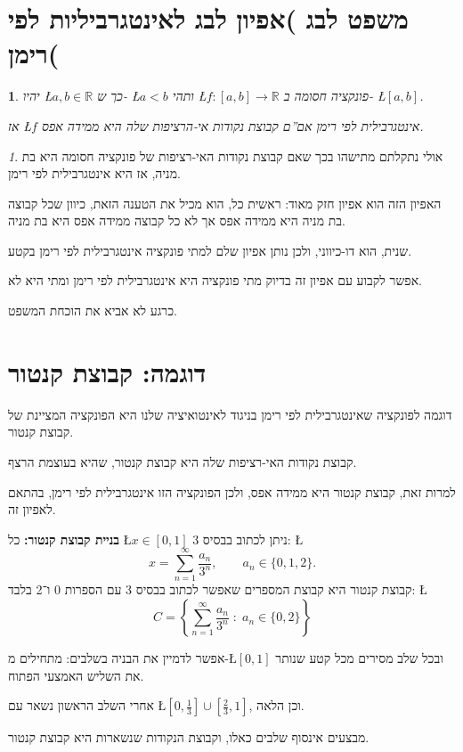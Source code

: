 \documentclass[english,hebrew]{article}
\theoremstyle{remark}
\newtheorem*{rem*}{\protect\remarkname}
\theoremstyle{definition}
\theoremstyle{plain}
\theoremstyle{remark}
\theoremstyle{plain}
\theoremstyle{plain}
\theoremstyle{definition}
\theoremstyle{plain}
\newtheorem*{thm*}{\protect\theoremname}
\providecommand{\remarkname}{הערה}
\providecommand{\theoremname}{משפט}
\begin{document}
\section{משפט לבג )אפיון לבג לאינטגרביליות לפי רימן(}
\begin{thm*}
יהיו \L{$a,b\in\mathbb{R}$} כך ש- \L{$a<b$} ותהי \L{$f:[a,b]\rightarrow\mathbb{R}$}
פונקציה חסומה ב- \L{$[a,b]$}.

אז \L{$f$} אינטגרבילית לפי רימן אם\textquotedblright ם קבוצת נקודות
אי-הרציפות שלה היא ממידה אפס.
\end{thm*}
\begin{rem*}
אולי נתקלתם מתישהו בכך שאם קבוצת נקודות האי-רציפות של פונקציה חסומה
היא בת מניה, אז היא אינטגרבילית לפי רימן.

האפיון הזה הוא אפיון חזק מאוד: ראשית כל, הוא מכיל את הטענה הזאת, כיוון
שכל קבוצה בת מניה היא ממידה אפס אך לא כל קבוצה ממידה אפס היא בת מניה.

שנית, הוא דו-כיווני, ולכן נותן אפיון שלם למתי פונקציה אינטגרבילית
לפי רימן בקטע.

אפשר לקבוע עם אפיון זה בדיוק מתי פונקציה היא אינטגרבילית לפי רימן
ומתי היא לא.

כרגע לא אביא את הוכחת המשפט.
\end{rem*}

\section{דוגמה: קבוצת קנטור}

דוגמה לפונקציה שאינטגרבילית לפי רימן בניגוד לאינטואיציה שלנו היא הפונקציה
המציינת של קבוצת קנטור.

קבוצת נקודות האי-רציפות שלה היא קבוצת קנטור, שהיא בעוצמת הרצף.

למרות זאת, קבוצת קנטור היא ממידה אפס, ולכן הפונקציה הזו אינטגרבילית
לפי רימן, בהתאם לאפיון זה.

\textbf{בניית קבוצת קנטור:} כל \L{$x\in[0,1]$} ניתן לכתוב בבסיס 3:
\L{%
\[
x=\sum_{n=1}^{\infty}\frac{a_{n}}{3^{n}},\qquad a_{n}\in\{0,1,2\}.
\]
}%
קבוצת קנטור היא קבוצת המספרים שאפשר לכתוב בבסיס 3 עם הספרות 0 ו־2
בלבד: \L{%
\[
C=\left\{ \sum_{n=1}^{\infty}\frac{a_{n}}{3^{n}}\;:\;a_{n}\in\{0,2\}\right\} 
\]
}%

אפשר לדמיין את הבניה בשלבים: מתחילים מ-\L{$\left[0,1\right]$} ובכל
שלב מסירים מכל קטע שנותר את השליש האמצעי הפתוח.

אחרי השלב הראשון נשאר עם \L{$\left[0,\frac{1}{3}\right]\cup\left[\frac{2}{3},1\right]$},
וכן הלאה.

מבצעים אינסוף שלבים כאלו, וקבוצת הנקודות שנשארות היא קבוצת קנטור.
\end{document}
